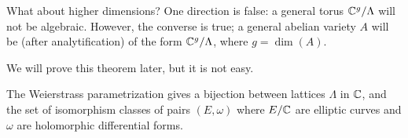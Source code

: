 What about higher dimensions? One direction is false: a general torus ${\mathbb C}^g/\Lambda$ will not be algebraic. However, the converse is true; a general abelian variety $A$ will be (after analytification) of the form ${\mathbb C}^g/\Lambda$, where $g=\dim(A)$. 

We will prove this theorem later, but it is not easy. 

\begin{theorem}
The Weierstrass parametrization gives a bijection between lattices $\Lambda$ in ${\mathbb C}$, and the set of isomorphism classes of pairs $(E,\omega)$ where $E/{\mathbb C}$ are elliptic curves and $\omega$ are holomorphic differential forms. 
\end{theorem}
